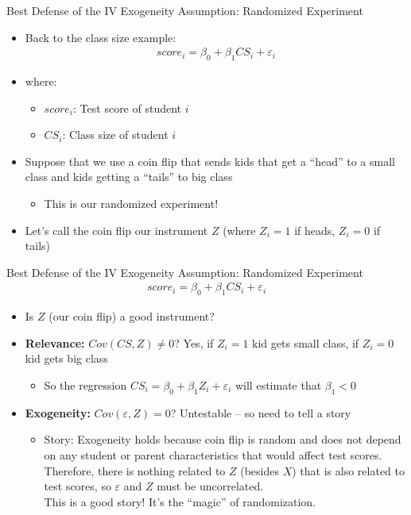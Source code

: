 \documentclass[aspectratio=169,11pt]{beamer}
\begin{document}
\begin{frame}{Best Defense of the IV Exogeneity Assumption: Randomized Experiment}
\begin{itemize}
\item Back to the class size example:
\begin{align*}
score_i = \beta_0 + \beta_1 \textit{CS}_i + \varepsilon_i
\end{align*}
\item where:
\begin{itemize}
\item $score_i$: Test score of student $i$
\item $CS_i$: Class size of student $i$
\end{itemize}
\medskip
\item Suppose that we use a coin flip that sends kids that get a ``head'' to a small class and kids getting a ``tails'' to big class
\begin{itemize}
\item This is our randomized experiment!
\end{itemize}
\medskip
\item Let's call the coin flip our instrument $Z$ (where $Z_i=1$ if heads, $Z_i=0$ if tails)
\end{itemize}
\end{frame}

\begin{frame}{Best Defense of the IV Exogeneity Assumption: Randomized Experiment}
\vspace{-0.5em}
\begin{align*}
score_i = \beta_0 + \beta_1 \textit{CS}_i + \varepsilon_i
\end{align*}
\begin{itemize}
\item Is $Z$ (our coin flip) a good instrument?
\medskip
\item {\bf Relevance:} $Cov(CS,Z)\ne 0$? Yes, if $Z_i=1$ kid gets small class, if $Z_i=0$ kid gets big class
\begin{itemize}
\item So the regression $CS_i=\beta_0 + \beta_1 Z_i + \varepsilon_i$ will estimate that $\beta_1<0$
\end{itemize}
\medskip
\item {\bf Exogeneity:} $Cov(\varepsilon,Z)= 0$? Untestable -- so need to tell a story
\begin{itemize}
\item Story: Exogeneity holds because coin flip is random and does not depend on any student or parent characteristics that would affect test scores.  Therefore, there is nothing related to $Z$ (besides $X$) that is also related to test scores, so $\varepsilon$ and $Z$ must be uncorrelated.\\
This is a good story! It's the ``magic'' of randomization.
\end{itemize}
\end{itemize}
\end{frame}
\end{document}
